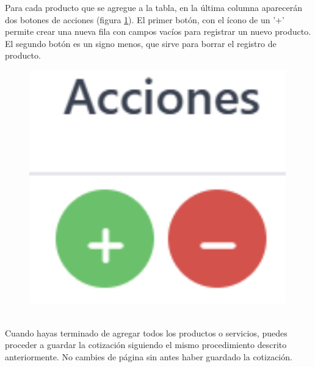 \documentclass{Pretexto/bluereport}
\begin{document}
\begin{minipage}
\begin{minipage}{0.78\linewidth}
    Para cada producto que se agregue a la tabla, en la última columna aparecerán dos botones de acciones
    (figura \ref{fig:icono_acciones}). El primer botón, con el ícono de un '+' permite crear una nueva
    fila con campos vacíos para registrar un nuevo producto. El segundo botón es un signo menos, que sirve 
    para borrar el registro de producto.
\end{minipage}
\hfil   
\begin{minipage}{0.08\linewidth}
    \begin{figure}[H]
        \centering
        \includegraphics[width=0.99\textwidth]{img/boton_acciones.png}
        \caption{}
        \label{fig:icono_acciones}
    \end{figure}
\end{minipage}
\vspace{0.5cm}
\\Cuando hayas terminado de agregar todos los productos o servicios, puedes proceder a guardar la cotización
 siguiendo el mismo procedimiento descrito anteriormente. No cambies de página sin antes haber guardado la cotización.

\end{minipage}
\end{document}
